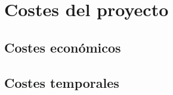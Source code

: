 \documentclass[../all.tex]{subfiles}
\begin{document}
\section{Costes del proyecto} 


\subsection{Costes económicos} 


\subsection{Costes temporales} 
\end{document}
